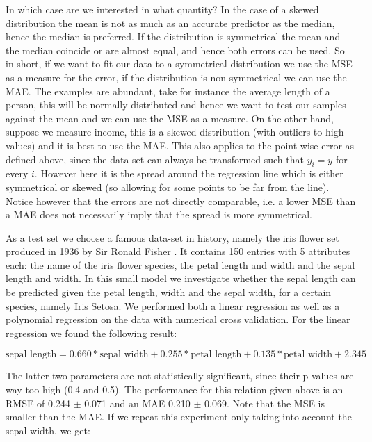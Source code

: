 \documentclass[a4]{article}
\begin{document}
In which case are we interested in what quantity? In the case of a skewed distribution the mean is not as much as an accurate predictor as the median, hence the median is preferred. If the distribution is symmetrical the mean and the median coincide or are almost equal, and hence both errors can be used. So in short, if we want to fit our data to a symmetrical distribution we use the MSE as a measure for the error, if the distribution is non-symmetrical we can use the MAE. The examples are abundant, take for instance the average length of a person, this will be normally distributed and hence we want to test our samples against the mean and we can use the MSE as a measure. On the other hand, suppose we measure income, this is a skewed distribution (with outliers to high values) and it is best to use the MAE. This also applies to the point-wise error as defined above, since the data-set can always be transformed such that $y_i = y$ for every $i$. However here it is the spread around the regression line which is either symmetrical or skewed (so allowing for some points to be far from the line). Notice however that the errors are not directly comparable, i.e. a lower MSE than a MAE does not necessarily imply that the spread is more symmetrical.

As a test set we choose a famous data-set in history, namely the iris flower set produced in 1936 by Sir Ronald Fisher \cite{Fischer}. It contains 150 entries with 5 attributes each: the name of the iris flower species, the petal length and width and the sepal length and width. In this small model we investigate whether the sepal length can be predicted given the petal length, width and the sepal width, for a certain species, namely Iris Setosa. We performed both a linear regression as well as a polynomial regression on the data with numerical cross validation. For the linear regression we found the following result:

\begin{equation*}
  \text{sepal length} = 0.660*\text{sepal width} + 0.255*\text{petal length} + 0.135*\text{petal width} + 2.345
\end{equation*}

The latter two parameters are not statistically significant, since their p-values are way too high (0.4 and 0.5). The performance for this relation given above is an RMSE of 0.244 $\pm$ 0.071 and an MAE 0.210 $\pm$ 0.069. Note that the MSE is smaller than the MAE. If we repeat this experiment only taking into account the sepal width, we get:
\end{document}
